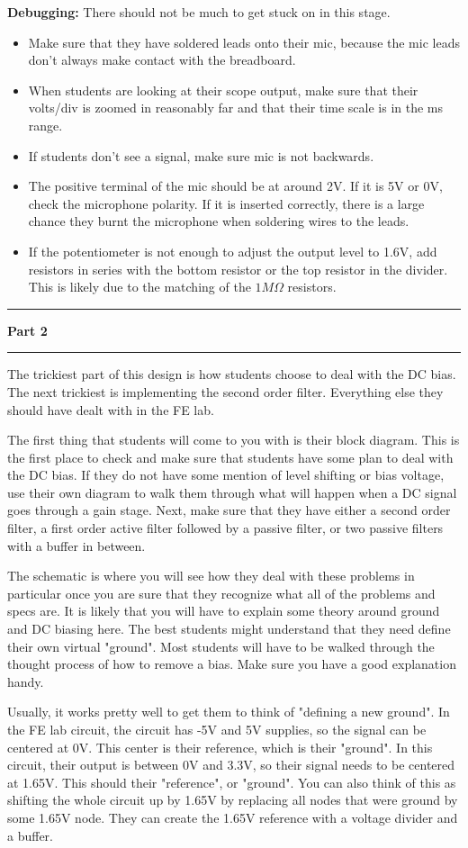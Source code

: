 \documentclass[11pt]{article}
\newcommand\header[1]{\vspace{.25in}\hrule\textbf{#1}\vspace{.5em}\hrule\vspace{.10in}}
\begin{document}
\textbf{Debugging:} There should not be much to get stuck on in this stage. 
\begin{itemize}
    \item Make sure that they have soldered leads onto their mic, because the mic leads don't always make contact with the breadboard.
    \item When students are looking at their scope output, make sure that their volts/div is zoomed in reasonably far and that their time scale is in the ms range.
    \item If students don't see a signal, make sure mic is not backwards.
    \item The positive terminal of the mic should be at around 2V. If it is 5V or 0V, check the microphone polarity. If it is inserted correctly, there is a large chance they burnt the microphone when soldering wires to the leads.
    \item If the potentiometer is not enough to adjust the output level to 1.6V, add resistors in series with the bottom resistor or the top resistor in the divider. This is likely due to the matching of the $1M\Omega$ resistors.
\end{itemize}


\header{Part 2}
The trickiest part of this design is how students choose to deal with the DC bias. The next trickiest is implementing the second order filter. Everything else they should have dealt with in the FE lab.

The first thing that students will come to you with is their block diagram. This is the first place to check and make sure that students have some plan to deal with the DC bias. If they do not have some mention of level shifting or bias voltage, use their own diagram to walk them through what will happen when a DC signal goes through a gain stage. Next, make sure that they have either a second order filter, a first order active filter followed by a passive filter, or two passive filters with a buffer in between.

The schematic is where you will see how they deal with these problems in particular once you are sure that they recognize what all of the problems and specs are. It is likely that you will have to explain some theory around ground and DC biasing here. The best students might understand that they need define their own virtual "ground". Most students will have to be walked through the thought process of how to remove a bias. Make sure you have a good explanation handy. 

Usually, it works pretty well to get them to think of "defining a new ground". In the FE lab circuit, the circuit has -5V and 5V supplies, so the signal can be centered at 0V. This center is their reference, which is their "ground". In this circuit, their output is between 0V and 3.3V, so their signal needs to be centered at 1.65V. This should their "reference", or "ground". You can also think of this as shifting the whole circuit up by 1.65V by replacing all nodes that were ground by some 1.65V node. They can create the 1.65V reference with a voltage divider and a buffer. 
\end{document}
